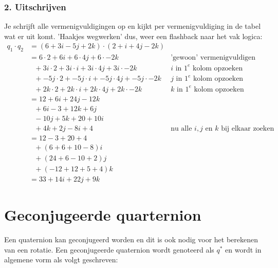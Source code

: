 \subsubsection{2. Uitschrijven} Je schrijft alle vermenigvuldigingen op en kijkt per vermenigvuldiging in de tabel wat er uit komt. 'Haakjes wegwerken' dus, weer een flashback naar het vak logica:
\begin{align*}
    q_1\cdot q_2 &= (6 + 3i - 5j + 2k) \cdot  (2 + i + 4j - 2k)& \\
                 &= 6\cdot 2 + 6i + 6\cdot 4j + 6\cdot -2k  &\text{'gewoon' vermenigvuldigen}\\
                 & \ \ \ + 3i\cdot 2 + 3i\cdot i + 3i\cdot 4j + 3i\cdot -2k &i \text{ in } 1^e \text{ kolom opzoeken}\\
                 & \ \ \ + -5j\cdot 2 + -5j\cdot i + -5j\cdot 4j + -5j\cdot -2k  &j \text{ in } 1^e \text{ kolom opzoeken}\\
                 & \ \ \ + 2k\cdot 2 + 2k\cdot i + 2k\cdot 4j + 2k\cdot -2k &k \text{ in } 1^e \text{ kolom opzoeken}\\
                 &= 12 + 6i + 24j - 12k &\\
                 & \ \ \ + 6i - 3 + 12k + 6j &\\
                 & \ \ \ -10j + 5k + 20 + 10i & \\
                 & \ \ \ + 4k + 2j - 8i + 4 \qquad \qquad \qquad   &\text{nu alle } i, j \text{ en } k \text{ bij elkaar  zoeken}\\
                 &= 12 - 3 + 20 + 4 & \\
                 & \ \ \ + (6+ 6 + 10 -8)i & \\
                 & \ \ \ + (24 + 6 - 10 + 2)j & \\
                 & \ \ \ + (-12 + 12 + 5 + 4)k & \\
                 &= 33 + 14i + 22j + 9k & 
\end{align*}
\section{Geconjugeerde quarternion}
Een quaternion kan geconjugeerd worden en dit is ook nodig voor het berekenen van een rotatie. Een geconjugeerde quaternion wordt genoteerd als $q^*$ en wordt in algemene vorm als volgt geschreven:


